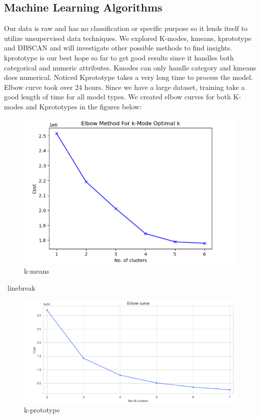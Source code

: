 \documentclass[conference]{IEEEtran}
\begin{document}
\subsection{Machine Learning Algorithms}
Our data is raw and has no classification or specific purpose so it lends itself to utilize unsupervised data techniques. 
We explored K-modes, kmeans, kprototype and DBSCAN and will investigate other possible methods to find insights. kprototype is our best hope so far to get good results since 
it handles both categorical and numeric attributes.  Kmodes can only handle category and kmeans does numerical. Noticed Kprototype takes a very long time to process the model.  Elbow curve took over 24 hours. Since we have a large dataset, training take a good length of time for all model types.  We created elbow curves for both K-modes and Kprototypes in the figures below:  
\begin{figure}[!h]
	\includegraphics[width=\linewidth]{k_mode_elbow.png}
	\caption{k-means}
	\label{fig: kmean elbow chart}
 \end{figure}
 \ linebreak
 \begin{figure}[!h]
	\includegraphics[width=\linewidth]{KPrototype_Elbow.png}
	\caption{k-prototype}
	\label{fig: kprototype elbow chart}
 \end{figure}
\end{document}
